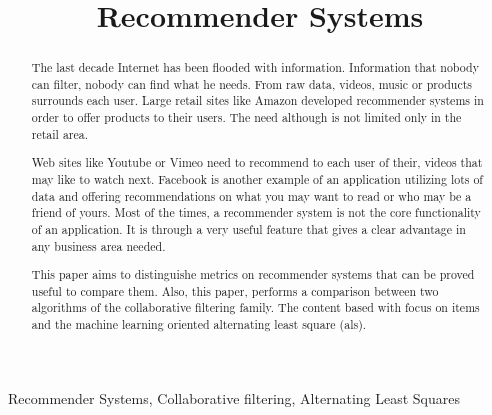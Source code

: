 \documentclass[10pt,journal]{IEEEtran}
\begin{document}
	
	\title{Recommender Systems} %
	\author{

		}

	\maketitle
	\begin{abstract}
		The last decade Internet has been flooded with information. Information that nobody can filter, nobody can find what he needs. From raw data, videos, music or products surrounds each user. Large retail sites like Amazon developed recommender systems in order to offer products to their users. The need although is not limited only in the retail area. 
		
		Web sites like Youtube or Vimeo need to recommend to each user of their, videos that may like to watch next. Facebook is another example of an application utilizing lots of data and offering recommendations on what you may want to read or who may be a friend of yours. Most of the times, a recommender system is not the core functionality of an application. It is through a very useful feature that gives a clear advantage in any business area needed.
		
		This paper aims to distinguishe metrics on recommender systems  that can be proved useful to compare them. Also, this paper, performs a comparison between two algorithms of the collaborative filtering family. The content based with focus on items and the machine learning oriented alternating least square (als).
	\end{abstract}
	\begin{IEEEkeywords}
		Recommender Systems, Collaborative filtering, Alternating Least Squares
	\end{IEEEkeywords}

	
	
	
	
	
	
\end{document}
